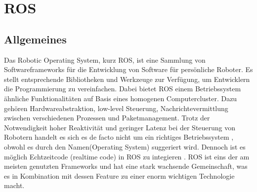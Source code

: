 \section{ROS}
\label{ROS}
\subsection{Allgemeines}
Das Robotic Operating System, kurz ROS, ist eine Sammlung von Softwareframeworks für die Entwicklung von Software für persönliche Roboter. Es stellt entsprechende Bibliotheken und Werkzeuge zur Verfügung, um Entwicklern die Programmierung zu vereinfachen. Dabei bietet ROS einem Betriebssystem ähnliche Funktionalitäten auf Basis eines homogenen Computercluster. Dazu gehören Hardwareabstraktion, low-level Steuerung, Nachrichtevermittlung zwischen verschiedenen Prozessen und Paketmanagement. Trotz der Notwendigkeit hoher Reaktivität und geringer Latenz bei der Steuerung von Robotern handelt es sich es de facto nicht um ein richtiges Betriebssystem , obwohl es durch den Namen(\grqq Operating System\grqq) suggeriert wird. Dennoch ist es möglich Echtzeitcode (\grqq realtime code\grqq) in ROS zu integieren \cite{realtimecode}. ROS ist eins der am meisten genutzten Frameworks und hat eine stark wachsende Gemeinschaft, was es in Kombination mit dessen Feature zu einer enorm wichtigen Technologie macht.


